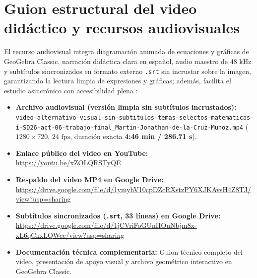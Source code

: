 \documentclass[spanish,letterpaper,oneside]{article}
\begin{document}
\section{Guion estructural del video didáctico y recursos audiovisuales}
El recurso audiovisual integra diagramación animada de ecuaciones y gráficas de GeoGebra Classic, narración didáctica clara en español, audio maestro de $48\text{ kHz}$ y subtítulos sincronizados en formato externo \texttt{.srt} sin incrustar sobre la imagen, garantizando la lectura limpia de expresiones y gráficas; además, facilita el estudio asincrónico con accesibilidad plena \citep{iiiepe2026_s13}:
\begin{itemize}
  \item \textbf{Archivo audiovisual (versión limpia sin subtítulos incrustados):} \texttt{video-alternativo-visual-sin-subtitulos-temas-selectos-matematicas-i-SD26-act-06-trabajo-final\_Martin-Jonathan-de-la-Cruz-Munoz.mp4} ($1280\times 720$, $24\text{ fps}$, duración exacta \textbf{4:46 min / 286.71 s}).
  \item \textbf{Enlace público del video en YouTube:} \url{https://youtu.be/xZOLQRSTyQE}
  \item \textbf{Respaldo del video MP4 en Google Drive:} \url{https://drive.google.com/file/d/1ymyhV10cpDZcRXstzPY6XJKAvsH4Z8TJ/view?usp=sharing}
  \item \textbf{Subtítulos sincronizados (\texttt{.srt}, 33 líneas) en Google Drive:} \url{https://drive.google.com/file/d/1jCVriFoGUnHOuNbjm8x-xL6qCkxLQWcc/view?usp=sharing}
  \item \textbf{Documentación técnica complementaria:} Guion técnico completo del video, presentación de apoyo visual y archivo geométrico interactivo en GeoGebra Classic.
\end{itemize}
\end{document}
